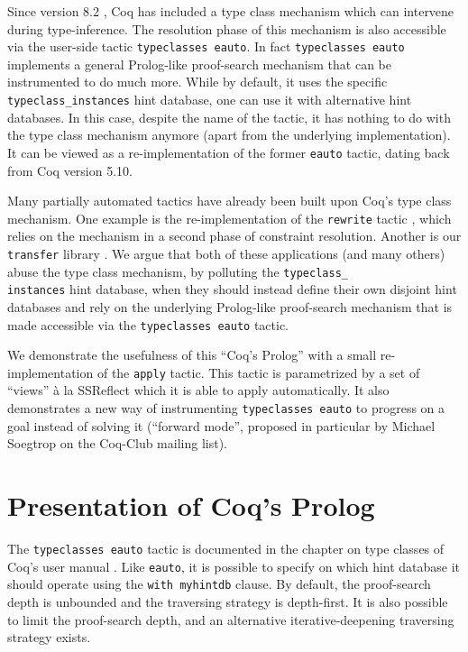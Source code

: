 \documentclass[nocopyrightspace,blockstyle,numbers]{sigplanconf}
\begin{document}
Since version 8.2 \cite{coq86manual}, Coq has included a type class
mechanism which can intervene during type-inference. The resolution
phase of this mechanism is also accessible via the user-side tactic
\texttt{typeclasses eauto}. In fact \texttt{typeclasses eauto}
implements a general Prolog-like proof-search mechanism that can be
instrumented to do much more. While by default, it uses the specific
\texttt{typeclass\_instances} hint database, one can use it with
alternative hint databases. In this case, despite the name of the
tactic, it has nothing to do with the type class mechanism anymore
(apart from the underlying implementation). It can be viewed as a
re-implementation of the former \texttt{eauto} tactic, dating back
from Coq version 5.10.

Many partially automated tactics have already been built upon Coq's type
class mechanism. One example is the re-implementation of the \texttt{rewrite}
tactic \cite{sozeau2010new}, which relies on the mechanism in
a second phase of constraint resolution. Another is our \texttt{transfer}
library \cite{zimmermann}. We argue that both of these applications (and
many others) abuse the type class mechanism, by polluting the
\texttt{typeclass\_\\instances} hint database, when they should instead
define their own disjoint hint databases and rely on the underlying
Prolog-like proof-search mechanism that is made accessible via the
\texttt{typeclasses eauto} tactic.

We demonstrate the usefulness of this ``Coq's Prolog'' with a small
re-implementation of the \texttt{apply} tactic. This tactic is parame\-trized
by a set of ``views'' à la SSReflect \cite{gonthier} which it is
able to apply automatically. It also demonstrates a new way of instrumenting
\texttt{typeclasses eauto} to progress on a goal instead of solving it
(``forward mode'', proposed in particular by Michael Soegtrop
on the Coq-Club mailing list).

\section{Presentation of Coq's Prolog}

The \texttt{typeclasses eauto} tactic is documented in the chapter on
type classes of Coq's user manual \cite[Chapter~20]{coq86manual}.
Like \texttt{eauto}, it is possible to specify on which hint database it
should operate using the \texttt{with myhintdb} clause.
By default, the proof-search depth is unbounded and the traversing
strategy is depth-first. It is also possible to limit the proof-search
depth, and an alternative iterative-deepening traversing strategy exists.
\end{document}
